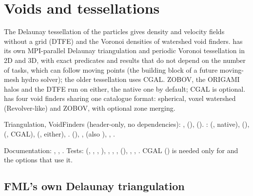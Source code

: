 \chapter{Voids and tessellations}\label{ch:voids}

The Delaunay tessellation of the particles gives density and velocity fields without a grid (DTFE) and the Voronoi densities of
watershed void finders. \fml{} has its own MPI-parallel Delaunay triangulation and periodic Voronoi tessellation in 2D and 3D, with
exact predicates and results that do not depend on the number of tasks, which can follow moving points (the building block of a
future moving-mesh hydro solver); the older tessellation uses CGAL. ZOBOV, the ORIGAMI halos and the DTFE run on either, the
native one by default; CGAL is optional. \fml{} has four void finders sharing one
catalogue format: spherical, voxel watershed (Revolver-like) and ZOBOV, with optional zone merging.

\begin{modulebox}{Triangulation, VoidFinders}
 (header-only, no dependencies):
,  (),  ().
:  (, native),
 (),  (,
CGAL),  (, either), . 
(), ,  (also ), ,
.\par
Documentation: , , . Tests: 
(, , , ),
, , ,  (),
, , . CGAL \cite{CGAL}
() is needed only for  and the options that use it.
\end{modulebox}

\section{FML's own Delaunay triangulation}\label{sec:voids-native}

